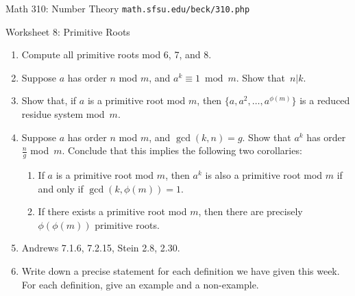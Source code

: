 \documentclass[11pt]{article}
\begin{document}
\setlength{\parindent}{0pt}
\setlength{\parskip}{0.2cm}

{ Math 310: Number Theory}
\hfill
{\tt math.sfsu.edu/beck/310.php}

\vspace{.3in}

\begin{center}
\Large{Worksheet 8: Primitive Roots}
\end{center}

\begin{enumerate}

\item Compute all primitive roots mod 6, 7, and 8.

\item Suppose $a$ has order $n$ mod $m$, and $a^k \equiv 1 \bmod m$. Show that~$n|k$.

\item Show that, if $a$ is a primitive root mod $m$, then $\{ a, a^2, \dots, a^{ \phi(m) } \}$ is a
reduced residue system mod~$m$.

\item Suppose $a$ has order $n$ mod $m$, and $\gcd(k,n) = g$. Show that $a^k$ has order $\frac n g$ mod~$m$.
Conclude that this implies the following two corollaries:
  \begin{enumerate}
  \item If $a$ is a primitive root mod $m$, then $a^k$ is also a primitive root mod $m$ if and only
if $\gcd(k, \phi(m)) = 1$.
  \item If there exists a primitive root mod $m$, then there are precisely $\phi(\phi(m))$ primitive
roots.
  \end{enumerate}

\item Andrews 7.1.6, 7.2.15, Stein 2.8, 2.30. %
 
\item Write down a precise statement for each definition we have given this week.
For each definition, give an example and a non-example.

\end{enumerate}
\end{document}
